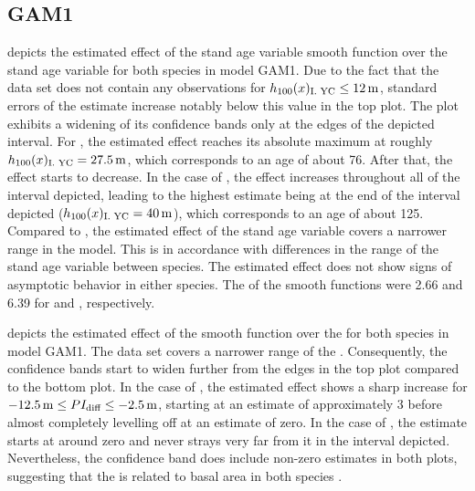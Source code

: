 \subsection{GAM1}

 depicts the estimated effect of the stand age variable smooth function over the stand age variable for both species in model GAM1.
Due to the fact that the \Beech{} data set does not contain any observations for \(h_{100}(x)_{\text{I. YC}}{} \leq \SI{12}{\meter}\), standard errors of the estimate increase notably below this value in the top plot.  The \Spruce{} plot exhibits a widening of its confidence bands only at the edges of the depicted interval.
For \Beech{}, the estimated effect reaches its absolute maximum at roughly \(h_{100}(x)_{\text{I. YC}}{} = \SI{27.5}{\meter}\), which corresponds to an age of about \SI{76}{\year}.  After that, the effect starts to decrease.  In the case of \Spruce{}, the effect increases throughout all of the interval depicted, leading to the highest estimate being at the end of the interval depicted (\(h_{100}(x)_{\text{I. YC}}{} = \SI{40}{\meter}\)), which corresponds to an age of about \SI{125}{\year}.  Compared to \Spruce{}, the estimated effect of the stand age variable covers a narrower range in the \Beech{} model.  This is in accordance with differences in the range of the stand age variable between species.  The estimated effect does not show signs of asymptotic behavior in either species.  The \edf{} of the smooth functions were \num{2.66} and \num{6.39} for \Beech{} and \Spruce{}, respectively.

 depicts the estimated effect of the \ProductivityIndexVariableText{} smooth function over the \ProductivityIndexVariableText{} for both species in model GAM1.
The \Beech{} data set covers a narrower range of the \ProductivityIndexVariableText{}.  Consequently, the confidence bands start to widen further from the edges in the top plot compared to the bottom plot.  In the case of \Beech{}, the estimated effect shows a sharp increase for \(\SI{-12.5}{\meter} \leq PI_{\text{diff}}{} \leq \SI{-2.5}{\meter}\), starting at an estimate of approximately \num{3} before almost completely levelling off at an estimate of zero.  In the case of \Spruce{}, the estimate starts at around zero and never strays very far from it in the interval depicted.  Nevertheless, the confidence band does include non-zero estimates in both plots, suggesting that the \ProductivityIndexVariableText{} is related to basal area in both species \parencite{Wood2001}.

